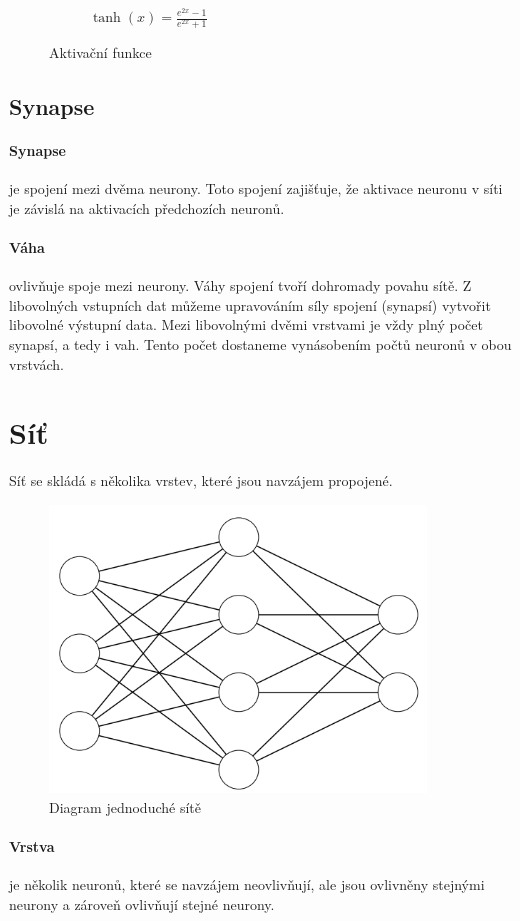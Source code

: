 \documentclass[12pt,a4paper]{report}
\begin{document}
\begin{figure}
\begin{subfigure}[h]{0.3\textwidth}
				\caption{$\tanh(x)=\frac{e^{2x}-1}{e^{2x}+1}$}
				\label{fig:hyperbolic tangent}
			\end{subfigure}
			\caption{Aktivační funkce}\label{fig:activation functions}
		\end{figure}
	\subsection{Synapse}
		\paragraph{Synapse} je spojení mezi dvěma neurony. Toto spojení zajišťuje, že aktivace neuronu v síti je závislá na aktivacích předchozích neuronů.
		\paragraph{Váha}
		ovlivňuje spoje mezi neurony. Váhy spojení tvoří dohromady povahu sítě. Z libovolných vstupních dat můžeme upravováním síly spojení (synapsí) vytvořit libovolné výstupní data. Mezi libovolnými dvěmi vrstvami je vždy plný počet synapsí, a tedy i vah. Tento počet dostaneme vynásobením počtů neuronů v obou vrstvách.
\section{Síť}
	Síť se skládá s několika vrstev, které jsou navzájem propojené.
	\begin{figure}[h]
		\centering
		\includegraphics[width=10cm]{images/nn3-4-2}
		\caption{Diagram jednoduché sítě}
	\end{figure}
	\paragraph{Vrstva}
	je několik neuronů, které se navzájem neovlivňují, ale jsou ovlivněny stejnými neurony a zároveň ovlivňují stejné neurony.
\end{document}
